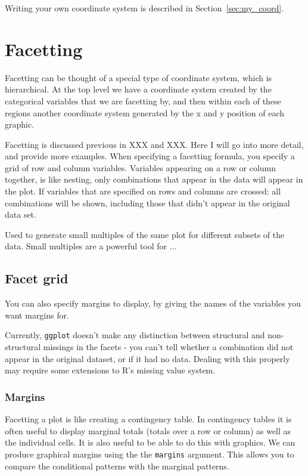 Writing your own coordinate system is described in Section~\ref{sec:my_coord}.


\section{Facetting}
\label{sec:facetting}

Facetting can be thought of a special type of coordinate system, which is hierarchical.  At the top level we have a coordinate system created by the categorical variables that we are facetting by, and then within each of these regions another coordinate system generated by the x and y position of each graphic.

Facetting is discussed previous in XXX and XXX.  Here I will go into more detail, and provide more examples.  When specifying a facetting formula, you specify a grid of row and column variables.  Variables appearing on a row or column together, is like nesting, only combinations that appear in the data will appear in the plot.  If variables that are specified on rows and columns are crossed: all combinations will be shown, including those that didn't appear in the original data set.

Used to generate small multiples of the same plot for different subsets of the data.  Small multiples are a powerful tool for ...  

\subsection{Facet grid}

You can also specify margins to display, by giving the names of the variables you want margins for.  


Currently, {\tt ggplot} doesn't make any distinction between structural and non-structural missings in the facets - you can't tell whether a combination did not appear in the original dataset, or if it had no data.  Dealing with this properly may require some extensions to R's missing value system.  


\subsubsection{Margins}\label{sub:margins}

Facetting a plot is like creating a contingency table.  In contingency tables it is often useful to display marginal totals (totals over a row or column) as well as the individual cells.  It is also useful to be able to do this with graphics.  We can produce graphical margins using the the {\tt margins} argument.  This allows you to compare the conditional patterns with the marginal patterns.

